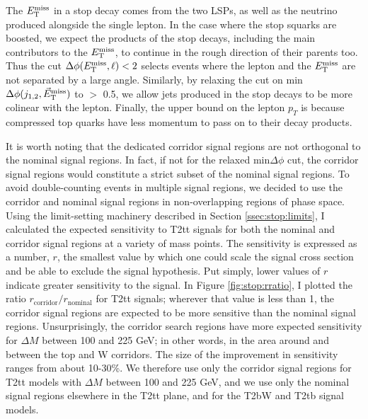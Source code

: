 The $E_\text{T}^\text{miss}$ in a stop decay comes from the two LSPs, as well as the
neutrino produced alongside the single lepton. In the case where the
stop squarks are boosted, we expect the products of the stop decays,
including the main contributors to the
$E_\text{T}^\text{miss}$, to continue in the rough direction of their parents too. Thus the cut
$\Delta\phi (E_\text{T}^\text{miss}, \ell) < 2$ selects events where the lepton and the
$E_\text{T}^\text{miss}$ are not separated by a large angle. Similarly, by relaxing
the cut on min$\Delta \phi(j_{1,2},\vec{E}_\text{T}^\text{miss})$ to $>$ 0.5, we allow jets
produced in the stop decays to be more colinear with the lepton.
Finally, the upper bound on the lepton $p_T$ is because compressed top
quarks have less momentum to pass on to their decay products.


It is worth noting that the dedicated corridor signal regions are not
orthogonal to the nominal signal regions. In fact, if not for the
relaxed min$\Delta\phi$ cut, the corridor signal regions would
constitute a strict subset of the nominal signal regions. To avoid
double-counting events in multiple signal regions, we decided to use
the corridor and nominal signal regions in non-overlapping regions of
phase space. Using the limit-setting machinery described in Section
\ref{ssec:stop:limits}, I calculated the expected sensitivity to T2tt
signals for both the nominal and corridor signal regions at a variety
of mass points. The sensitivity is expressed as a number, $r$, the
smallest value by which one could scale the signal cross section and
be able to exclude the signal hypothesis. Put simply, lower values
of $r$ indicate greater sensitivity to the signal. In Figure
\ref{fig:stop:rratio}, I plotted the ratio
$r_\text{corridor} / r_\text{nominal}$ for T2tt signals; wherever that value is less
than 1, the corridor signal regions are expected to be more sensitive
than the nominal signal regions. Unsurprisingly, the corridor search
regions have more expected sensitivity for $\Delta M$ between 100 and
225 GeV; in other words, in the area around and between the top and W
corridors. The size of the improvement in sensitivity ranges from
about 10-30\%. We therefore use only the corridor signal regions for
T2tt models with $\Delta M$ between 100 and 225 GeV, and we use only
the nominal signal regions elsewhere in the T2tt plane, and for the
T2bW and T2tb signal models.

